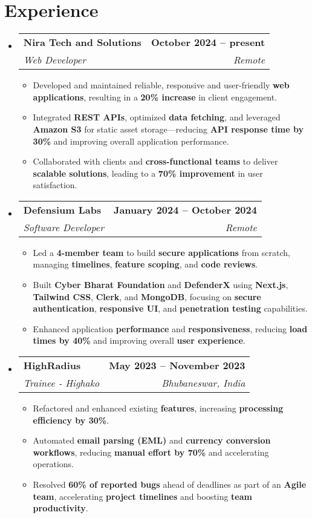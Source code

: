 \documentclass[letterpaper,11pt]{article}
\makeatletter
\newcommand{\resumeItem}[1]{
  \item\small{
    {#1 \vspace{-2pt}}
  }
}
\newcommand{\resumeSubheading}[4]{
  \vspace{-2pt}\item
    \begin{tabular*}{1.0\textwidth}[t]{l@{\extracolsep{\fill}}r}
      \textbf{#1} & \textbf{\small #2} \\
      \textit{\small#3} & \textit{\small #4} \\
    \end{tabular*}\vspace{-7pt}
}
\newcommand{\resumeSubHeadingListStart}{\begin{itemize}[leftmargin=0.0in, label={}]}
\newcommand{\resumeSubHeadingListEnd}{\end{itemize}}
\newcommand{\resumeItemListStart}{\raggedright \begin{itemize} \vspace{0pt}}
\newcommand{\resumeItemListEnd}{\end{itemize}\vspace{-1pt}}
\makeatother
\begin{document}
\vspace{-16pt}

\section{Experience}
  \resumeSubHeadingListStart

  \resumeSubheading
      {Nira Tech and Solutions}{October 2024 -- present}
      {Web Developer}{Remote}
      \resumeItemListStart
        \resumeItem{Developed and maintained reliable, responsive and user-friendly \textbf{web applications}, resulting in a \textbf{20\% increase} in client engagement.}
        \resumeItem{Integrated \textbf{REST APIs}, optimized \textbf{data fetching}, and leveraged \textbf{Amazon S3} for static asset storage—reducing \textbf{API response time by 30\%} and improving overall application performance.}
        \resumeItem{Collaborated with clients and \textbf{cross-functional teams} to deliver  \textbf{scalable solutions}, leading to a \textbf{70\% improvement} in user satisfaction.}
      \resumeItemListEnd

    \resumeSubheading
      {Defensium Labs}{January 2024 -- October 2024}
      {Software Developer}{Remote}
      \resumeItemListStart
        \resumeItem{Led a \textbf{4-member team} to build \textbf{secure applications} from scratch, managing \textbf{timelines}, \textbf{feature scoping}, and \textbf{code reviews}.}
        \resumeItem{Built \textbf{Cyber Bharat Foundation} and \textbf{DefenderX} using \textbf{Next.js}, \textbf{Tailwind CSS}, \textbf{Clerk}, and \textbf{MongoDB}, focusing on \textbf{secure authentication}, \textbf{responsive UI}, and \textbf{penetration testing} capabilities.}
        \resumeItem{Enhanced application \textbf{performance} and \textbf{responsiveness}, reducing \textbf{load times by 40\%} and improving overall \textbf{user experience}.}
      \resumeItemListEnd
    
    \resumeSubheading
    {HighRadius }{May 2023 -- November 2023}
    {Trainee - Highako}{Bhubaneswar, India}
    \resumeItemListStart
      \resumeItem{Refactored and enhanced existing \textbf{features}, increasing \textbf{processing efficiency by 30\%}.}
      \resumeItem{Automated \textbf{email parsing (EML)} and \textbf{currency conversion workflows}, reducing \textbf{manual effort by 70\%} and accelerating operations.}
      \resumeItem{Resolved \textbf{60\% of reported bugs} ahead of deadlines as part of an \textbf{Agile team}, accelerating \textbf{project timelines} and boosting \textbf{team productivity}.}
    \resumeItemListEnd
  \resumeSubHeadingListEnd
\end{document}
